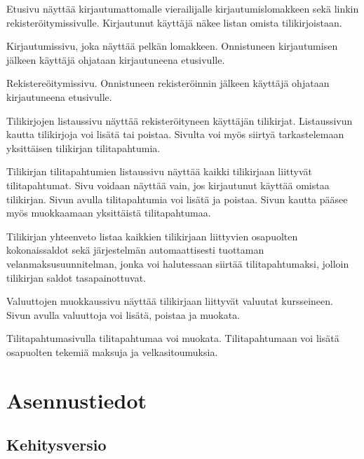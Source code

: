 \documentclass[a4paper,parskip=half]{scrartcl}
\begin{document}
\begin{description}[style=nextline]
  \item[/]{
      Etusivu näyttää kirjautumattomalle vierailijalle kirjautumislomakkeen sekä
      linkin rekisteröitymissivulle. Kirjautunut käyttäjä näkee listan omista
      tilikirjoistaan.
    }
  \item[/login]{
      Kirjautumissivu, joka näyttää pelkän lomakkeen. Onnistuneen kirjautumisen
      jälkeen käyttäjä ohjataan kirjautuneena etusivulle.
    }
  \item[/signup]{
      Rekistereöitymissivu. Onnistuneen rekisteröinnin jälkeen käyttäjä ohjataan
      kirjautuneena etusivulle.
    }
  \item[/ledgers]{
      Tilikirjojen listaussivu näyttää rekisteröityneen käyttäjän tilikirjat.
      Listaussivun kautta tilikirjoja voi lisätä tai poistaa. Sivulta voi myös
      siirtyä tarkastelemaan yksittäisen tilikirjan tilitapahtumia.
    }
  \item[/ledgers/:ledgerId]{
      Tilikirjan tilitapahtumien listaussivu näyttää kaikki tilikirjaan
      liittyvät tilitapahtumat. Sivu voidaan näyttää vain, jos kirjautunut
      käyttää omistaa tilikirjan. Sivun avulla tilitapahtumia voi lisätä ja
      poistaa. Sivun kautta pääsee myös muokkaamaan yksittäistä tilitapahtumaa.
    }
  \item[/ledgers/:ledgerId/summary]{
      Tilikirjan yhteenveto listaa kaikkien tilikirjaan liittyvien osapuolten
      kokonaissaldot sekä järjestelmän automaattisesti tuottaman
      velanmaksusuunnitelman, jonka voi halutessaan siirtää tilitapahtumaksi,
      jolloin tilikirjan saldot tasapainottuvat.
    }
  \item[/ledgers/:ledgerId/currencies]{
      Valuuttojen muokkaussivu näyttää tilikirjaan liittyvät valuutat
      kursseineen.  Sivun avulla valuuttoja voi lisätä, poistaa ja muokata.
    }
  \item[/ledgers/:ledgersId/:transactionId]{
      Tilitapahtumasivulla tilitapahtumaa voi muokata. Tilitapahtumaan voi
      lisätä osapuolten tekemiä maksuja ja velkasitoumuksia.
    }
\end{description}

\section{Asennustiedot}

\subsection{Kehitysversio}
\end{document}
